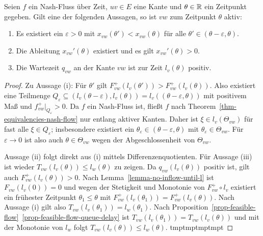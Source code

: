 \begin{lemma}\label{lemma-nash-flow-waiting-queue-implies-active-edge}
	Seien $f$ ein Nash-Fluss über Zeit, $uv\in E$ eine Kante und $\theta\in\mathbb{R}$ ein Zeitpunkt gegeben.
	Gilt eine der folgenden Aussagen, so ist $vw$ zum Zeitpunkt $\theta$ aktiv:
	\begin{enumerate}[label=(\roman*)]
		\item Es existiert ein $\varepsilon>0$ mit $x_{vw}(\theta')<x_{vw}(\theta)$ für alle $\theta'\in(\theta-\varepsilon, \theta)$.
		\item Die Ableitung $x_{vw}'(\theta)$ existiert und es gilt $x_{vw}'(\theta)> 0$.
		\item Die Wartezeit $q_{vw}$ an der Kante $vw$ ist zur Zeit $l_v(\theta)$ positiv.
	\end{enumerate}
\end{lemma}
\begin{proof}
	Zu Aussage (i): Für $\theta'$ gilt $F_{vw}^+(l_v(\theta')) > F_{vw}^+(l_v(\theta))$.
	Also existiert eine Teilmenge $Q_\varepsilon \subseteq (l_v(\theta-\varepsilon), l_v(\theta))=l_v((\theta - \varepsilon, \theta))$ mit positivem Maß und $f_{vw}^+\big|_{Q_\varepsilon} > 0$.
	Da $f$ ein Nash-Fluss ist, fließt $f$ nach Theorem~\ref{thm-equivalencies-nash-flow} nur entlang aktiver Kanten.
	Daher ist $\xi\in l_v(\Theta_{vw})$ für fast alle $\xi\in Q_\varepsilon$; insbesondere existiert ein $\theta_\varepsilon\in (\theta-\varepsilon, \theta)$ mit $\theta_\varepsilon\in\Theta_{vw}$.
	Für $\varepsilon\rightarrow0$ ist also auch $\theta\in\Theta_{vw}$ wegen der Abgeschlossenheit von $\Theta_{vw}$.
	
	Aussage (ii) folgt direkt aus (i) mittels Differenzenquotienten.
	Für Aussage (iii) ist wieder $T_{vw}(l_v(\theta)) \leq l_w(\theta)$ zu zeigen.
	Da $q_{vw}(l_v(\theta))$ positiv ist, gilt auch $F^+_{vw}(l_v(\theta)) > 0$.
	Nach Lemma~\ref{lemma-no-inflow-until-l} ist $F_{vw}(l_v(0))=0$ und wegen der Stetigkeit und Monotonie von $F_{vw}^+\circ l_v$ existiert
	ein frühester Zeitpunkt $\theta_1\leq\theta$ mit $F_{vw}^+(l_v(\theta_1)) = F_{vw}^+(l_v(\theta))$.
	Nach Aussage (i) gilt also $T_{vw}(l_v(\theta_1)) = l_w(\theta_1)$.
	Nach Proposition~\ref{prop-feasible-flow}~\ref{prop-feasible-flow-queue-delay} ist $T_{vw}(l_v(\theta_1)) = T_{vw}(l_v(\theta))$ und mit der Monotonie von $l_w$ folgt $T_{vw}(l_v(\theta))\leq l_w(\theta)$.	
	tmptmptmptmpt
\end{proof}

